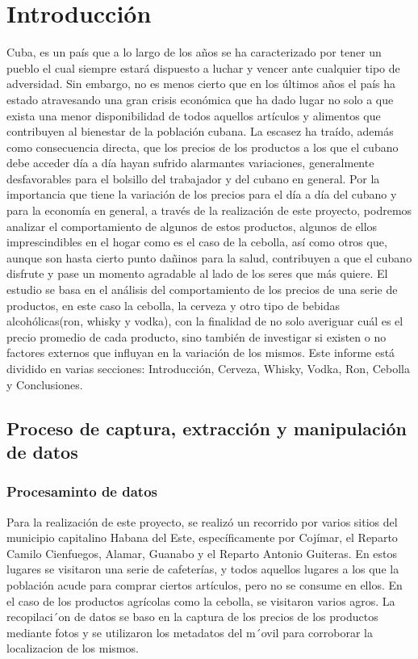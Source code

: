 \documentclass[a4paper,12pt]{article}
\begin{document}
	\section{Introducción}
	Cuba, es un país que a lo largo de los años se ha caracterizado por tener un pueblo el cual siempre estará dispuesto a luchar y vencer ante cualquier tipo de adversidad. Sin embargo, no es menos cierto que en los últimos años el país ha estado atravesando una gran crisis económica que ha dado lugar no solo a que exista una menor disponibilidad de todos aquellos artículos y alimentos que contribuyen al bienestar de la población cubana. La escasez ha traído, además como consecuencia directa, que los precios de los productos a los que el cubano debe acceder día a día hayan sufrido alarmantes variaciones, generalmente desfavorables para el bolsillo del trabajador y del cubano en general.
	Por la importancia que tiene la variación de los precios para el día a día del cubano y para la economía en general, a través de la realización de este proyecto, podremos analizar el comportamiento de algunos de estos productos, algunos de ellos imprescindibles en el hogar como es el caso de la cebolla, así como otros que, aunque son hasta cierto punto dañinos para la salud, contribuyen a que el cubano disfrute y pase un momento agradable al lado de los seres que más quiere. El estudio se basa en el análisis del comportamiento de los precios de una serie de productos, en este caso la cebolla, la cerveza y otro tipo de bebidas alcohólicas(ron, whisky y vodka), con la finalidad de no solo averiguar cuál es el precio promedio de cada producto, sino también de investigar si existen o no factores externos que influyan en la variación de los mismos.
	Este informe está dividido en varias secciones: Introducción, Cerveza, Whisky, Vodka, Ron, Cebolla y Conclusiones.
	
		\newpage
		\subsection{Proceso de captura, extracción y manipulación de datos}
			\subsubsection{Procesaminto de datos}
			Para la realización de este proyecto, se realizó un recorrido por varios sitios del municipio capitalino Habana del Este, específicamente por Cojímar, el Reparto Camilo Cienfuegos, Alamar, Guanabo y el Reparto Antonio Guiteras. En estos lugares se visitaron
			una serie de cafeterías, y todos aquellos lugares a los que la población acude para comprar
			ciertos artículos, pero no se consume en ellos. En el caso de los productos agrícolas como
			la cebolla, se visitaron varios agros. La recopilaci´on de datos se baso en la captura de
			los precios de los productos mediante fotos y se utilizaron los metadatos del m´ovil para
			corroborar la localizacion de los mismos.
\end{document}
